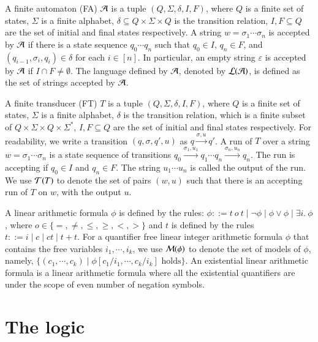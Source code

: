 \documentclass{llncs}
\begin{document}
A finite automaton (FA) $\mathcal{A}$ is a tuple $(Q, \Sigma, \delta, I, F)$, where $Q$ is a finite set of states, $\Sigma$ is a finite alphabet, $\delta \subseteq Q \times \Sigma \times Q$ is the transition relation, $I,F \subseteq Q$ are the set of initial and final states respectively. A string $w=\sigma_1 \cdots \sigma_n$ is accepted by $\mathcal{A}$ if there is a state sequence $q_0 \cdots q_n$ such that $q_0 \in I$, $q_n \in F$, and $(q_{i-1}, \sigma_i, q_i) \in \delta$ for each $i \in [n]$. In particular, an empty string $\varepsilon$ is accepted by $\mathcal{A}$ if $I \cap F \neq \emptyset$. The language defined by $\mathcal{A}$, denoted by $\mathcal{L}(\mathcal{A})$, is defined as the set of strings accepted by $\mathcal{A}$.

A finite transducer (FT) $T$ is a tuple $(Q, \Sigma, \delta, I, F)$, where $Q$ is a finite set of states, $\Sigma$ is a finite alphabet, $\delta$ is the transition relation, which is a finite subset of $Q \times \Sigma \times Q \times \Sigma^*$, $I,F \subseteq Q$ are the set of initial and final states respectively. For readability, we write a transition $(q, \sigma, q', u)$ as $q \xrightarrow{\sigma, u} q'$. A run of $T$ over a string $w=\sigma_1 \cdots \sigma_n$ is a state sequence of transitions $q_0 \xrightarrow{\sigma_1, u_1} q_1 \cdots q_n \xrightarrow{\sigma_n, u_n} q_n$. The run is accepting if $q_0 \in I$ and $q_n \in F$. The string $u_1 \cdots u_n$ is called the output of the run. We use $\mathcal{T}(T)$ to denote the set of pairs $(w, u)$ such that there is an accepting run of $T$ on $w$, with the output $u$.

A linear arithmetic formula $\phi$ is defined by the rules: $\phi::= t \ o \ t \mid \neg \phi \mid \phi \vee \phi \mid \exists i.\ \phi$, where $o \in \{=, \neq, \le, \ge, <, >\}$ and $t$ is defined by the rules $t::= i \mid c \mid ct \mid t + t $.  
For a quantifier free linear integer arithmetic formula $\phi$ that contains the free variables $i_1, \cdots, i_k$, we use $\mathcal{M}(\phi)$ to denote the set of models of $\phi$, namely, $\{(c_1, \cdots ,c_k) \mid \phi[c_1/i_1, \cdots, c_k/i_k] \mbox{ holds}\}$. An existential linear arithmetic formula is a linear arithmetic formula where all the existential quantifiers are under the scope of even number of negation symbols.

\section{The logic \slint}
\end{document}
